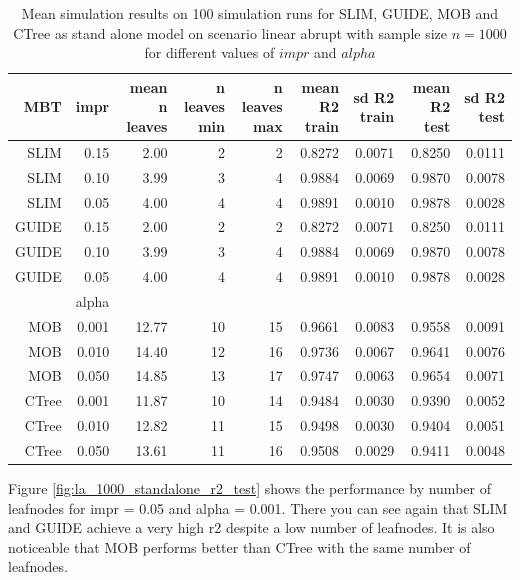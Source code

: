 \begin{table}

\caption{Mean simulation results on 100 simulation runs for SLIM, GUIDE, MOB and CTree as stand alone model on scenario linear abrupt with sample size $n = 1000$ for different values of $impr$ and $alpha$}
\centering \tiny
\begin{tabular}[t]{r|r|r|r|r|r|r|r|r}
\hline
MBT & impr & mean n leaves & n leaves min & n leaves max & mean R2 train & sd R2 train & mean R2 test & sd R2 test\\
\hline
SLIM & 0.15 & 2.00 & 2 & 2 & 0.8272 & 0.0071 & 0.8250 & 0.0111\\
SLIM & 0.10 & 3.99 & 3 & 4 & 0.9884 & 0.0069 & 0.9870 & 0.0078\\
SLIM & 0.05 & 4.00 & 4 & 4 & 0.9891 & 0.0010 & 0.9878 & 0.0028\\
GUIDE & 0.15 & 2.00 & 2 & 2 & 0.8272 & 0.0071 & 0.8250 & 0.0111\\
GUIDE & 0.10 & 3.99 & 3 & 4 & 0.9884 & 0.0069 & 0.9870 & 0.0078\\
GUIDE & 0.05 & 4.00 & 4 & 4 & 0.9891 & 0.0010 & 0.9878 & 0.0028\\
\hline
 & alpha & & & & & & & \\
\hline
MOB & 0.001 & 12.77 & 10 & 15 & 0.9661 & 0.0083 & 0.9558 & 0.0091\\
MOB & 0.010 & 14.40 & 12 & 16 & 0.9736 & 0.0067 & 0.9641 & 0.0076\\
MOB & 0.050 & 14.85 & 13 & 17 & 0.9747 & 0.0063 & 0.9654 & 0.0071\\
CTree & 0.001 & 11.87 & 10 & 14 & 0.9484 & 0.0030 & 0.9390 & 0.0052\\
CTree & 0.010 & 12.82 & 11 & 15 & 0.9498 & 0.0030 & 0.9404 & 0.0051\\
CTree & 0.050 & 13.61 & 11 & 16 & 0.9508 & 0.0029 & 0.9411 & 0.0048\\
\hline
\end{tabular}
\label{tab:linear_abrupt_summary} 
\end{table}


Figure \ref{fig:la_1000_standalone_r2_test} shows the performance by number of leafnodes for impr = 0.05 and alpha = 0.001. There you can see again that SLIM and GUIDE achieve a very high r2 despite a low number of leafnodes. It is also noticeable that MOB performs better than CTree with the same number of leafnodes.

